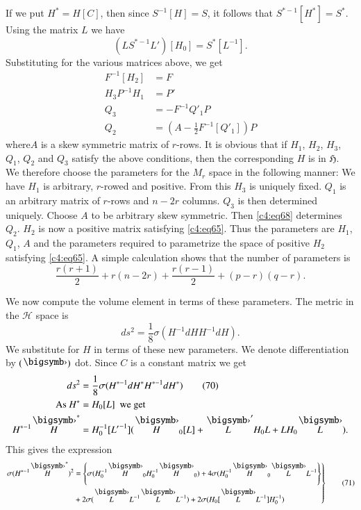 If we put $H^{\ast}=H[C]$, then since $S^{-1}[H]=S$, it follows that
$S^{\ast-1}[H^{\ast}]=S^{\ast}$. Using the matrix $L$ we have
$$
(LS^{\ast-1}L')[H_{0}]=S^{\ast}[L^{-1}].
$$
Substituting for the various matrices above, we get
\begin{align*}
F^{-1}[H_{2}] &= F\tag{65}\label{c4:eq65}\\
H_{3}P^{-1}H_{1} &= P'\tag{66}\label{c4:eq66}\\
Q_{3} &= -F^{-1}Q'_{1}P\tag{67}\label{c4:eq67}\\
Q_{2} &= (A-\frac{1}{2}F^{-1}[Q'_{1}])P\tag{68}\label{c4:eq68}
\end{align*}
where\pageoriginale $A$ is a skew symmetric matrix of $r$-rows. It is
obvious that if $H_{1}$, $H_{2}$, $H_{3}$, $Q_{1}$, $Q_{2}$ and
$Q_{3}$ satisfy the above conditions, then the corresponding $H$ is in
$\mathfrak{H}$. We therefore choose the parameters for the $M_{r}$
space in the following manner: We have $H_{1}$ is arbitrary, $r$-rowed
and positive. From this $H_{3}$ is uniquely fixed. $Q_{1}$ is an
arbitrary matrix of $r$-rows and $n-2r$ columns. $Q_{3}$ is then
determined uniquely. Choose $A$ to be arbitrary skew symmetric. Then
\eqref{c4:eq68} determines $Q_{2}$. $H_{2}$ is now a positive matrix
satisfying \eqref{c4:eq65}. Thus the parameters are $H_{1}$, $Q_{1}$, $A$
and the parameters required to parametrize the space of positive
$H_{2}$ satisfying \eqref{c4:eq65}. A simple calculation shows that the
number of parameters is
\begin{equation*}
\frac{r(r+1)}{2}+r(n-2r)+\frac{r(r-1)}{2}+(p-r)(q-r).\tag{69}\label{c4:eq69}
\end{equation*}

We now compute the volume element in terms of these parameters. The
metric in the $\mathscr{H}$ space is
$$
ds^{2}=\frac{1}{8}\sigma(H^{-1}dHH^{-1}dH).
$$
We substitute for $H$ in terms of these new parameters. We denote
differentiation by $(\bigdot)$ dot. Since $C$ is a constant matrix we
get 
\begin{align*}
ds^{2} &=
\frac{1}{8}\sigma(H^{\ast-1}dH^{\ast}H^{\ast-1}dH^{\ast})\tag{70}\label{c4:eq70}\\ 
\text{As } H^{\ast} &= H_{0}[L]\text{ \ we get}\\
H^{\ast-1}\overdot{H}^{\ast} &=H^{-1}_{0}[{L'}^{-1}](\overdot{H}_{0}[L]+\overdot{L}'H_{0}L+LH_{0}\overdot{L}). 
\end{align*}
This gives the expression
\begin{equation*}
\left.
\begin{aligned}
\sigma (H^{\ast-1}\overdot{H}^{\ast})^{2} &=
  \left\{\sigma(H^{-1}_{0}\overdot{H}_{0}H^{-1}_{0}\overdot{H}_{0})+4\sigma(H^{-1}_{0}\overdot{H}_{0}\overdot{L}L^{-1}\right\}\\
&+2\sigma(\overdot{L}L^{-1}\overdot{L}L^{-1})+2\sigma(H_{0}[\overdot{L}L^{-1}]H^{-1}_{0})
\end{aligned}
\right\}\tag{71}\label{c4:eq71}
\end{equation*}

